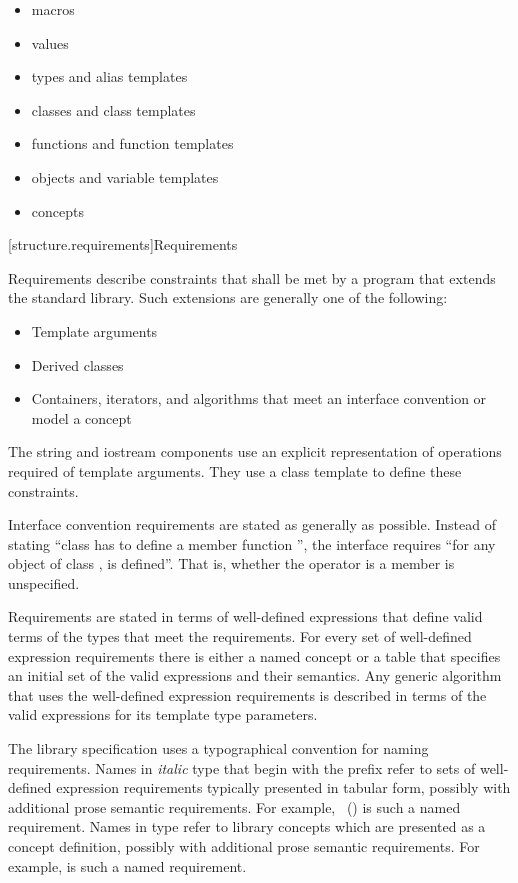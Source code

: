 \begin{itemize}
\item macros
\item values
\item types and alias templates
\item classes and class templates
\item functions and function templates
\item objects and variable templates
\item concepts
\end{itemize}

[structure.requirements]{Requirements}

\pnum
{}%
Requirements describe constraints that shall be met by a \Cpp{} program that extends the standard library.
Such extensions are generally one of the following:

\begin{itemize}
\item Template arguments
\item Derived classes
\item Containers, iterators, and algorithms that meet an interface convention or
  model a concept
\end{itemize}

\pnum
The string and iostream components use an explicit representation of operations
required of template arguments. They use a class template  to
define these constraints.

\pnum
Interface convention requirements are stated as generally as possible. Instead
of stating ``class  has to define a member function '', the
interface requires ``for any object  of class ,  is
defined''. That is, whether the operator is a member is unspecified.

\pnum
Requirements are stated in terms of well-defined expressions that define valid terms of
the types that meet the requirements. For every set of well-defined expression
requirements there is either a named concept or a table that specifies an initial set of the valid expressions and
their semantics. Any generic algorithm that uses the
well-defined expression requirements is described in terms of the valid expressions for
its template type parameters.

\pnum
The library specification uses a typographical convention for naming
requirements. Names in \textit{italic} type that begin with the prefix
\oldconcept{} refer to sets of well-defined expression requirements typically
presented in tabular form, possibly with additional prose semantic requirements.
For example, ~() is such a named
requirement. Names in  type refer to library concepts
which are presented as a concept definition, possibly with additional
prose semantic requirements. For example,
is such a named requirement.

